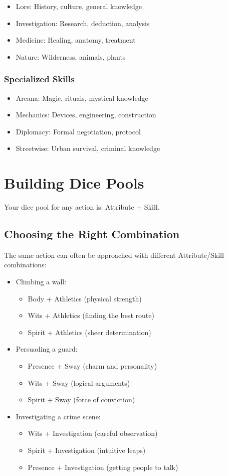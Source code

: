 \documentclass[11pt,twoside,openany]{book}
\begin{document}
\begin{itemize}
\item Lore: History, culture, general knowledge
\item Investigation: Research, deduction, analysis
\item Medicine: Healing, anatomy, treatment
\item Nature: Wilderness, animals, plants
\end{itemize}

\subsubsection*{Specialized Skills}

\begin{itemize}
\item Arcana: Magic, rituals, mystical knowledge
\item Mechanics: Devices, engineering, construction
\item Diplomacy: Formal negotiation, protocol
\item Streetwise: Urban survival, criminal knowledge
\end{itemize}

\section*{Building Dice Pools} 

Your dice pool for any action is: Attribute + Skill.

\subsection*{Choosing the Right Combination}

The same action can often be approached with different Attribute/Skill combinations:
\begin{itemize}
\item Climbing a wall:
\begin{itemize}
\item Body + Athletics (physical strength)
\item Wits + Athletics (finding the best route)
\item Spirit + Athletics (sheer determination)
\end{itemize}
\item Persuading a guard:
\begin{itemize}
\item Presence + Sway (charm and personality)
\item Wits + Sway (logical arguments)
\item Spirit + Sway (force of conviction)
\end{itemize}
\item Investigating a crime scene:
\begin{itemize}
\item Wits + Investigation (careful observation)
\item Spirit + Investigation (intuitive leaps)
\item Presence + Investigation (getting people to talk)
\end{itemize}
\end{itemize}
\end{document}

